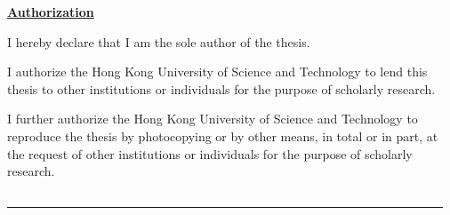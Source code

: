 \null{}
\begin{center}
{\bf \Large \underline{Authorization}}
\end{center}
\vspace{12mm}

I hereby declare that I am the sole author of the thesis.

\vspace{10mm}

I authorize the Hong Kong University of Science and Technology to lend this
thesis to other institutions or individuals for the purpose of scholarly research.

\vspace{10mm}

I further authorize the Hong Kong University of Science and Technology to
reproduce the thesis by photocopying or by other means, in total or in part, at the
request of other institutions or individuals for the purpose of scholarly research.

\vspace{30mm}

\begin{center}
\underline{~~~~~~~~~~~~~~~~~~~~~~~~~~~~~~~~~~~~~~~~~~~~~~~~~~~~~~~~~~~~~~~~~~~~~~}\\
~~~~\thesisauthor \\
~~~~\signdate

\end{center}
